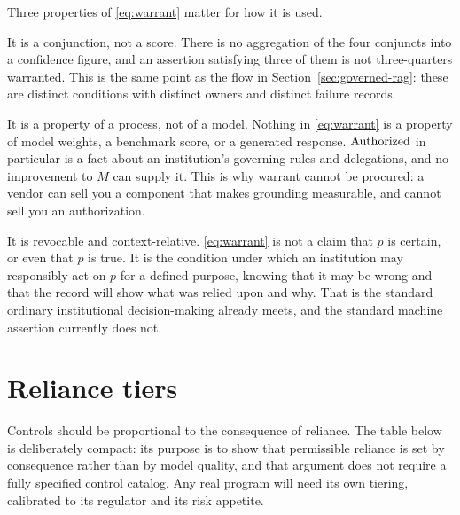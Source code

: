 Three properties of \eqref{eq:warrant} matter for how it is used.

It is a conjunction, not a score. There is no aggregation of the four conjuncts into
a confidence figure, and an assertion satisfying three of them is not
three-quarters warranted. This is the same point as the flow in
Section~\ref{sec:governed-rag}: these are distinct conditions with distinct owners
and distinct failure records.

It is a property of a process, not of a model. Nothing in \eqref{eq:warrant} is a
property of model weights, a benchmark score, or a generated response.
$\operatorname{Authorized}$ in particular is a fact about an institution's governing rules and
delegations, and no improvement to $M$ can supply it. This is why warrant cannot be
procured: a vendor can sell you a component that makes grounding measurable, and
cannot sell you an authorization.

It is revocable and context-relative. \eqref{eq:warrant} is not a claim that $p$ is
certain, or even that $p$ is true. It is the condition under which an institution
may responsibly act on $p$ for a defined purpose, knowing that it may be wrong and
that the record will show what was relied upon and why. That is the standard
ordinary institutional decision-making already meets, and the standard machine
assertion currently does not.

\section{Reliance tiers}

Controls should be proportional to the consequence of reliance. The table below is
deliberately compact: its purpose is to show that permissible reliance is set by
consequence rather than by model quality, and that argument does not require a
fully specified control catalog. Any real program will need its own tiering,
calibrated to its regulator and its risk appetite.

